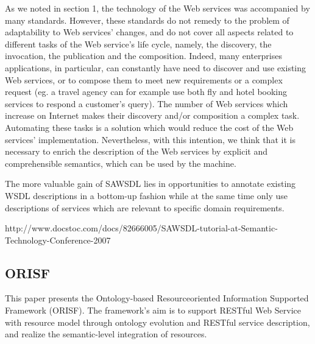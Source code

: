 As we noted in section 1, the technology of the Web
services was accompanied by many standards. However,
these standards do not remedy to the problem of adaptability
to Web services’ changes, and do not cover all aspects related
to different tasks of the Web service’s life cycle, namely, the
discovery, the invocation, the publication and the
composition. Indeed, many enterprises applications, in
particular, can constantly have need to discover and use
existing Web services, or to compose them to meet new
requirements or a complex request (eg. a travel agency can
for example use both fly and hotel booking services to
respond a customer’s query). The number of Web services
which increase on Internet makes their discovery and/or
composition a complex task. Automating these tasks is a
solution which would reduce the cost of the Web services’
implementation. Nevertheless, with this intention, we think
that it is necessary to enrich the description of the Web
services by explicit and comprehensible semantics, which can
be used by the machine. \cite{ei-sawsdl}

The more valuable
gain of SAWSDL lies in opportunities to annotate existing
WSDL descriptions in a bottom-up fashion while at the
same time only use descriptions of services which are relevant
to specific domain requirements. \cite{WSMOLITE}

http://www.docstoc.com/docs/82666005/SAWSDL-tutorial-at-Semantic-Technology-Conference-2007

\subsection{ORISF}

This paper presents the Ontology-based Resourceoriented
Information Supported Framework (ORISF). The
framework’s aim is to support RESTful Web Service with
resource model through ontology evolution and RESTful
service description, and realize the semantic-level
integration of resources. \cite{zg-ontorest}
